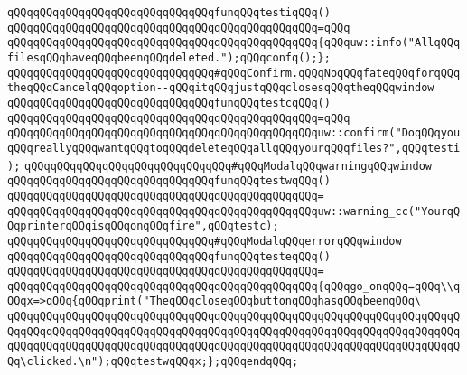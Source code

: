 \newline
\verb|qQQqqQQqqQQqqQQqqQQqqQQqqQQqqQQqfunqQQqtestiqQQq()|\newline
\verb|qQQqqQQqqQQqqQQqqQQqqQQqqQQqqQQqqQQqqQQqqQQqqQQq=qQQq|\newline
\verb|qQQqqQQqqQQqqQQqqQQqqQQqqQQqqQQqqQQqqQQqqQQqqQQq{qQQquw::info("AllqQQqfilesqQQqhaveqQQqbeenqQQqdeleted.");qQQqconfq();};|\newline
\newline
\verb|qQQqqQQqqQQqqQQqqQQqqQQqqQQqqQQq#qQQqConfirm.qQQqNoqQQqfateqQQqforqQQqtheqQQqCancelqQQqoption--qQQqitqQQqjustqQQqclosesqQQqtheqQQqwindow|\newline
\newline
\verb|qQQqqQQqqQQqqQQqqQQqqQQqqQQqqQQqfunqQQqtestcqQQq()|\newline
\verb|qQQqqQQqqQQqqQQqqQQqqQQqqQQqqQQqqQQqqQQqqQQqqQQq=qQQq|\newline
\verb|qQQqqQQqqQQqqQQqqQQqqQQqqQQqqQQqqQQqqQQqqQQqqQQquw::confirm("DoqQQqyouqQQqreallyqQQqwantqQQqtoqQQqdeleteqQQqallqQQqyourqQQqfiles?",qQQqtesti);|\newline
\newline
\verb|qQQqqQQqqQQqqQQqqQQqqQQqqQQqqQQq#qQQqModalqQQqwarningqQQqwindow|\newline
\newline
\verb|qQQqqQQqqQQqqQQqqQQqqQQqqQQqqQQqfunqQQqtestwqQQq()|\newline
\verb|qQQqqQQqqQQqqQQqqQQqqQQqqQQqqQQqqQQqqQQqqQQqqQQq=|\newline
\verb|qQQqqQQqqQQqqQQqqQQqqQQqqQQqqQQqqQQqqQQqqQQqqQQquw::warning_cc("YourqQQqprinterqQQqisqQQqonqQQqfire",qQQqtestc);|\newline
\newline
\verb|qQQqqQQqqQQqqQQqqQQqqQQqqQQqqQQq#qQQqModalqQQqerrorqQQqwindow|\newline
\newline
\verb|qQQqqQQqqQQqqQQqqQQqqQQqqQQqqQQqfunqQQqtesteqQQq()|\newline
\verb|qQQqqQQqqQQqqQQqqQQqqQQqqQQqqQQqqQQqqQQqqQQqqQQq=|\newline
\verb|qQQqqQQqqQQqqQQqqQQqqQQqqQQqqQQqqQQqqQQqqQQqqQQq{qQQqgo_onqQQq=qQQq\\qQQqx=>qQQq{qQQqprint("TheqQQqcloseqQQqbuttonqQQqhasqQQqbeenqQQq\|\newline
\verb|qQQqqQQqqQQqqQQqqQQqqQQqqQQqqQQqqQQqqQQqqQQqqQQqqQQqqQQqqQQqqQQqqQQqqQQqqQQqqQQqqQQqqQQqqQQqqQQqqQQqqQQqqQQqqQQqqQQqqQQqqQQqqQQqqQQqqQQqqQQqqQQqqQQqqQQqqQQqqQQqqQQqqQQqqQQqqQQqqQQqqQQqqQQqqQQqqQQqqQQqqQQqqQQqqQQq\clicked.\n");qQQqtestwqQQqx;};qQQqendqQQq;|\newline
